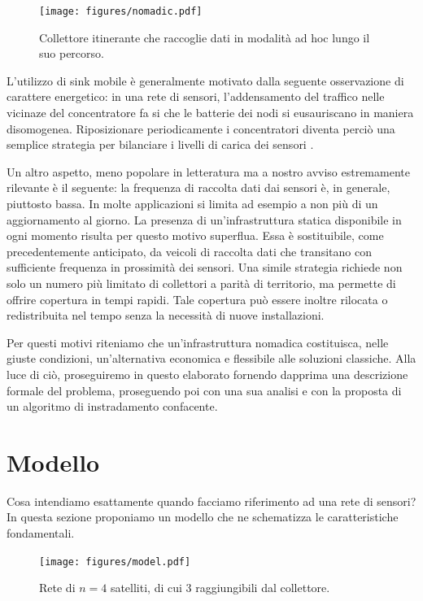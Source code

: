 \documentclass[a4paper,11pt]{article}
\theoremstyle{definition}
\begin{document}
\begin{figure}[H]
\centering
\texttt{[image: figures/nomadic.pdf]}
\caption{Collettore itinerante che raccoglie dati in modalità ad hoc lungo il suo percorso.}
\end{figure}

L'utilizzo di sink mobile è generalmente motivato dalla seguente osservazione di carattere energetico: in una rete di sensori, l'addensamento del traffico nelle vicinaze del concentratore fa si che le batterie dei nodi si eusauriscano in maniera disomogenea. Riposizionare periodicamente i concentratori diventa perciò una semplice strategia per bilanciare i livelli di carica dei sensori \cite{moblife1, moblife2}.

Un altro aspetto, meno popolare in letteratura ma a nostro avviso estremamente rilevante è il seguente: la frequenza di raccolta dati dai sensori è, in generale, piuttosto bassa. In molte applicazioni si limita ad esempio a non più di un aggiornamento al giorno. La presenza di un'infrastruttura statica disponibile in ogni momento risulta per questo motivo superflua. Essa è sostituibile, come precedentemente anticipato, da veicoli di raccolta dati che transitano con sufficiente frequenza in prossimità dei sensori. Una simile strategia richiede non solo un numero più limitato di collettori a parità di territorio, ma permette di offrire copertura in tempi rapidi. Tale copertura può essere inoltre rilocata o redistribuita nel tempo senza la necessità di nuove installazioni.

Per questi motivi riteniamo che un'infrastruttura nomadica costituisca, nelle giuste condizioni, un'alternativa economica e flessibile alle soluzioni classiche. Alla luce di ciò, proseguiremo in questo elaborato fornendo dapprima una descrizione formale del problema, proseguendo poi con una sua analisi e con la proposta di un algoritmo di instradamento confacente.

\section{Modello}

Cosa intendiamo esattamente quando facciamo riferimento ad una rete di sensori? In questa sezione proponiamo un modello che ne schematizza le caratteristiche fondamentali.

\begin{figure}[H]
\centering
\texttt{[image: figures/model.pdf]}
\caption{Rete di $n=4$ satelliti, di cui 3 raggiungibili dal collettore.}
\end{figure}
\end{document}
